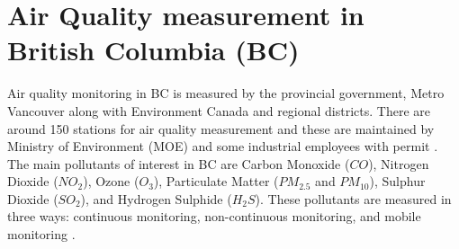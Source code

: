 




\par





 \section{Air Quality measurement in British Columbia (BC)}

 Air quality monitoring in BC is measured by the provincial government, Metro Vancouver along with Environment Canada and regional districts. There are around 150 stations for air quality measurement and these are maintained by Ministry of Environment (MOE) and some industrial employees with permit \cite{bc}. The main pollutants of interest in BC are Carbon Monoxide ($CO$), Nitrogen Dioxide ($NO_{2}$), Ozone ($O_{3}$), Particulate Matter ($PM_{2.5}$ and $PM_{10}$), Sulphur Dioxide ($SO_{2}$), and Hydrogen Sulphide ($H_{2}S$). These pollutants are measured in three ways: continuous monitoring, non-continuous monitoring, and mobile monitoring \cite{bc}.
 
